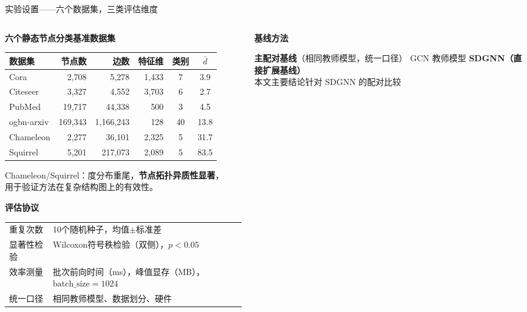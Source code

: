 \documentclass[aspectratio=169,9pt,xcolor=dvipsnames]{beamer}
\newcommand{\highlight}[1]{\textcolor{myred}{\textbf{#1}}}
\newcommand{\blue}[1]{\textcolor{mynavy}{#1}}
\begin{document}
\begin{frame}{实验设置——六个数据集，三类评估维度}
\begin{columns}[T]

\begin{column}{0.48\textwidth}
  \textbf{\blue{六个静态节点分类基准数据集}}

  \medskip
  {
  \small
  \begin{tabular}{@{}lrrrcc@{}}
    \toprule
    数据集 & 节点数 & 边数 & 特征维 & 类别 & $\bar{d}$ \\
    \midrule
    Cora & 2,708 & 5,278 & 1,433 & 7 & 3.9 \\
    Citeseer & 3,327 & 4,552 & 3,703 & 6 & 2.7 \\
    PubMed & 19,717 & 44,338 & 500 & 3 & 4.5 \\
    ogbn-arxiv & 169,343 & 1,166,243 & 128 & 40 & 13.8 \\
    Chameleon & 2,277 & 36,101 & 2,325 & 5 & 31.7 \\
    Squirrel & 5,201 & 217,073 & 2,089 & 5 & 83.5 \\
    \bottomrule
  \end{tabular}
  }

  \medskip
  Chameleon/Squirrel：度分布重尾，\highlight{节点拓扑异质性显著}，\\
  用于验证方法在复杂结构图上的有效性。

  \medskip
  \textbf{\blue{评估协议}}

  \medskip
  \begin{tabular}{m{1.7cm}p{5cm}}
    重复次数 & 10个随机种子，均值$\pm$标准差 \\[3pt]
    显著性检验 & Wilcoxon符号秩检验（双侧），$p<0.05$ \\[3pt]
    效率测量 & 批次前向时间（ms），峰值显存（MB），$\mathrm{batch\_size}\!=\!1024$ \\[3pt]
    统一口径 & 相同教师模型、数据划分、硬件 \\
  \end{tabular}
\end{column}
\hfill
\begin{column}{0.48\textwidth}
  \textbf{\blue{基线方法}}

  \begin{alertblock}{\textbf{主配对基线}（相同教师模型，统一口径）}
    GCN 教师模型 \quad \highlight{SDGNN（直接扩展基线）}\\
    本文主要结论针对 SDGNN 的配对比较
  \end{alertblock}


\end{column}
\end{columns}
\end{frame}
\end{document}
